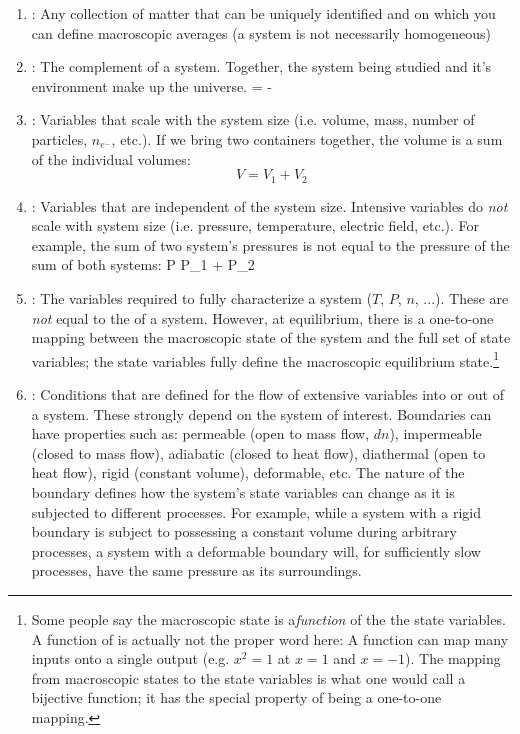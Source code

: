 \documentclass[12pt]{article}
\begin{document}
\begin{enumerate}
\item {}: Any collection of matter that can be uniquely identified and on which you can define macroscopic averages (a system is not necessarily homogeneous)
\item {}: The complement of a system. Together, the system being studied and it's environment make up the universe. 
\eqs
\text{[environment]} = \text{[universe]} - \text{[system]}
\eqe
\item {}: Variables that scale with the system size (i.e. volume, mass, number of particles, $n_{e^-}$, etc.).  If we bring two containers together, the volume is a sum of the individual volumes:
\begin{equation}
V = V_1 + V_2
\end{equation}
\item {}: Variables that are independent of the system size. Intensive variables do \emph{not} scale with system size (i.e. pressure, temperature, electric field, etc.).  For example, the sum of two system's pressures is not equal to the pressure of the sum of both systems:
\eqs
P \neq P_1 + P_2
\eqe
\item {}: The variables required to fully characterize a system ($T$, $P$, $n$, ...).  These are \emph{not} equal to the  of a system. However, at equilibrium, there is a one-to-one mapping between the macroscopic state of the system and the full set of state variables; the state variables fully define the macroscopic equilibrium state.\footnote{Some people say the macroscopic state is a\emph{function} of the the state variables. A function of is actually not the proper word here: A  function can map many inputs onto a single output (e.g. $x^2 = 1$ at $x = 1$ and $x=-1$). The mapping from macroscopic states to the state variables is what one would call a bijective function; it has the special property of being a one-to-one mapping.}
\item {}: Conditions that are defined for the flow of extensive variables into or out of a system.  These strongly depend on the system of interest. Boundaries can have properties such as: permeable (open to mass flow, $dn$), impermeable (closed to mass flow), adiabatic (closed to heat flow), diathermal (open to heat flow), rigid (constant volume), deformable, etc. The nature of the boundary defines how the system's state variables can change as it is subjected to different processes. For example, while a system with a rigid boundary is subject to possessing a constant volume during arbitrary processes, a system with a deformable boundary will, for sufficiently slow processes, have the same pressure as its surroundings.
\end{enumerate}
\end{document}
